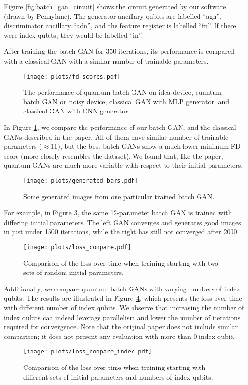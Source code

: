 Figure \ref{fig:batch_gan_circuit} shows the circuit generated by our software 
(drawn by Pennylane).   The generator ancillary qubits are labelled ``agn'', 
discriminator ancillary ``adn'', and the feature register is labelled ``fn''.
If there were index qubits, they would be labelled ``in''.

After training the batch GAN for 350 iterations, its performance is compared with a classical 
GAN with a similar number of trainable parameters.

\begin{figure}[H]
    \centering
    \texttt{[image: plots/fd\_scores.pdf]}
    \caption{The performance of quantum batch GAN on idea device, quantum batch GAN on noisy device, classical GAN with MLP generator, and classical GAN with CNN generator.}
    \label{fig:fd_scores}
\end{figure}

In Figure \ref{fig:fd_scores}, we compare the performance of our batch GAN, and the classical GANs 
described in the paper. All of them have similar number of trainable parameters ($\approx$11), but the best batch GANs show 
a much lower minimum FD score (more closely resembles the dataset).  We found that, like the paper,
quantum GANs are much more variable with respect to their initial parameters.

\begin{figure}[H]
    \centering
    \texttt{[image: plots/generated\_bars.pdf]}
    \caption{Some generated images from one particular trained batch GAN.}
    \label{fig:generated_bars}
\end{figure}

For example, in Figure \ref{fig:loss_compare}, the same 12-parameter batch GAN is trained
with differing initial parameters.  The left GAN converges and generates good images in just under 
1500 iterations, while the right has still not converged after 2000.

\begin{figure}[H]
    \centering
    \texttt{[image: plots/loss\_compare.pdf]}
    \caption{Comparison of the loss over time when training starting with two sets of random initial parameters.}
    \label{fig:loss_compare}
\end{figure}

Additionally, we compare quantum batch GANs with varying numbers of index qubits. 
The results are illustrated in Figure~\ref{fig:loss_compare_index}, which presents the loss over time with different number of index qubits.
We observe that increasing the number of index qubits can indeed leverage parallelism and 
lower the number of iterations required for convergence. Note that the original paper does not
include similar comparison; it does not present any evaluation with more than 0 index qubit.

\begin{figure}[H]
    \centering
    \texttt{[image: plots/loss\_compare\_index.pdf]}
    \caption{Comparison of the loss over time when training starting with different sets of initial parameters and numbers of index qubits.}
    \label{fig:loss_compare_index}
\end{figure}
